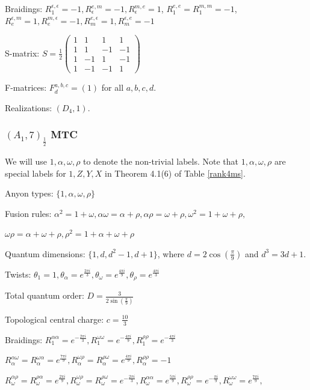 \documentclass[12pt,psamsfonts]{amsart}
\newcommand{\e}{{\epsilon}}
\numberwithin{equation}{section}
\theoremstyle{definition}
\begin{document}
Braidings: $R^{\e,\e}_1=-1, R^{e,m}_{\e}=-1,R^{m,e}_{\e}=1$,
$R^{e,e}_{1}=R^{m,m}_{1}=-1$,
$R^{\e,m}_{e}=1,R^{m,\e}_{e}=-1,R^{e,\e}_{m}=1, R^{\e,e}_{m}=-1$

S-matrix: $S=\frac{1}{2}\begin{pmatrix}
   1& 1& 1 &1 \\
   1 & 1& -1&-1  \\
   1 & -1 &1 &-1 \\
   1 &-1 & -1& 1
 \end{pmatrix}$

F-matrices: $F^{a,b,c}_d=(1)$ for all $a,b,c,d$.

Realizations: $(D_4,1)$.

\subsubsection{$(A_1,7)_{\frac{1}{2}}$ MTC}

We will use $1,\alpha,\omega,\rho$ to denote the non-trivial
labels.  Note that $1,\alpha,\omega,\rho$ are special labels for
$1,Z,Y,X$ in Theorem 4.1(6) of Table \ref{rank4ms}.

Anyon types: $\{1,\alpha, \omega,\rho\}$

Fusion rules:
$\alpha^2=1+\omega,\alpha\omega=\alpha+\rho,\alpha\rho=\omega+\rho,\omega^2=1+\omega+\rho,$

$\omega\rho=\alpha+\omega+\rho,\rho^2=1+\alpha+\omega+\rho$

Quantum dimensions: $\{1,d,d^2-1,d+1\}$, where
$d=2\cos(\frac{\pi}{9})$ and $d^3=3d+1$.

Twists: $\theta_1=1, \theta_{\alpha}=e^{\frac{2\pi i}{3}},
\theta_{\omega}=e^{\frac{4\pi i}{9}}, \theta_{\rho}=e^{\frac{4\pi
i}{3}}$

Total quantum order: $D=\frac{3}{2\sin(\frac{\pi}{9})}$

Topological central charge: $c=\frac{10}{3}$

Braidings: $R_1^{\alpha \alpha}=e^{-\frac{2\pi i}{3}},
R_1^{\omega\omega}=e^{-\frac{4\pi i}{9}},R_1^{\rho
\rho}=e^{-\frac{4\pi i}{3}}$

$R_{\alpha}^{\alpha\omega}=R_{\alpha}^{\omega\alpha}=e^{\frac{7\pi
i}{9}},
R_{\alpha}^{\omega\rho}=R_{\alpha}^{\rho\omega}=e^{\frac{4\pi
i}{9}},
R_{\alpha}^{\rho\rho}=-1$

$R_{\omega}^{\alpha\rho}=R_{\omega}^{\rho\alpha}=e^{\frac{2\pi
i}{9}},
R_{\omega}^{\omega\rho}=R_{\omega}^{\rho\omega}=e^{-\frac{2\pi
i}{3}}, R_{\omega}^{\alpha\alpha}=e^{\frac{5\pi i}{9}},
R_{\omega}^{\rho\rho}=e^{-\frac{\pi i}{9}},
R_{\omega}^{\omega\omega}=e^{\frac{7\pi i}{9}},$
\end{document}
